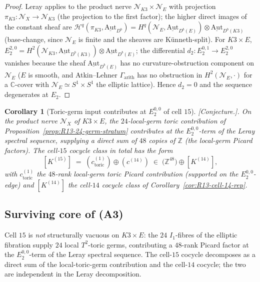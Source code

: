 \documentclass[11pt]{amsart}
\newtheorem{corollary}[theorem]{Corollary}
\providecommand{\C}{\mathbb{C}}
\providecommand{\Z}{\mathbb{Z}}
\providecommand{\Aut}{\mathrm{Aut}}
\providecommand{\cN}{\mathcal{N}}
\providecommand{\cH}{\mathcal{H}}
\providecommand{\ClaimStatusConjectured}{[\emph{Conjecture.}]}
\begin{document}
\begin{proof}
Leray applies to the product nerve $\cN_{K3} \times \cN_E$ with
projection $\pi_{K3}: \cN_X \to \cN_{K3}$ (the projection to the first
factor); the higher direct images of the constant sheaf are
$\cH^q(\pi_{K3}, \underline{\Aut}_{D^b}) = H^q(\cN_E,
\underline{\Aut}_{D^b(E)}) \otimes \underline{\Aut}_{D^b(K3)}$
(base-change, since $\cN_E$ is finite and the sheaves are K\"{u}nneth-split).
For $K3 \times E$, $E_2^{2, 0} = H^2(\cN_{K3}, \underline{\Aut}_{D^b(K3)})
\otimes \underline{\Aut}_{D^b(E)}$; the differential
$d_2: E_2^{0, 1} \to E_2^{2, 0}$ vanishes because the sheaf
$\underline{\Aut}_{D^b(E)}$ has no curvature-obstruction component
on $\cN_E$ ($E$ is smooth, and Atkin--Lehner $\Gamma_{\mathrm{arith}}$
has no obstruction in $H^2(\cN_E, \cdot)$ for a $\C$-cover with
$\cN_E \simeq S^1 \times S^1$ the elliptic lattice). Hence $d_2 = 0$
and the sequence degenerates at $E_2$.
\end{proof}

\begin{corollary}[Toric-germ input contributes at $E_2^{0,0}$ of
cell $15$]
\label{cor:R13-toric-input-E2-00}
\ClaimStatusConjectured.
On the product nerve $\cN_X$ of $K3 \times E$, the $24$-local-germ
toric contribution of Proposition~\ref{prop:R13-24-germ-stratum}
contributes at the
$E_2^{0, 0}$-term of the Leray spectral sequence, supplying a direct
sum of $48$ copies of $\Z$ (the local-germ Picard factors). The
cell-$15$ cocycle class in total has the form
\[
  [K^{(15)}] \;=\; (c^{(1)}_{\mathrm{toric}}) \oplus (c^{(14)})
  \;\in\; \bigl(\Z^{48}\bigr) \oplus [K^{(14)}],
\]
with $c^{(1)}_{\mathrm{toric}}$ the $48$-rank local-germ toric Picard
contribution (supported on the $E_2^{0, 0}$-edge) and $[K^{(14)}]$
the cell-$14$ cocycle class of Corollary~\ref{cor:R13-cell-14-rep}.
\end{corollary}

\subsection*{Surviving core of (A3)}

Cell $15$ is \emph{not} structurally vacuous on $K3 \times E$: the $24$
$I_1$-fibres of the elliptic fibration supply $24$ local $T^2$-toric
germs, contributing a $48$-rank Picard factor at the
$E_2^{0,0}$-term of the Leray spectral sequence. The cell-$15$
cocycle decomposes as a direct sum of the local-toric-germ contribution
and the cell-$14$ cocycle; the two are independent in the Leray
decomposition.
\end{document}
